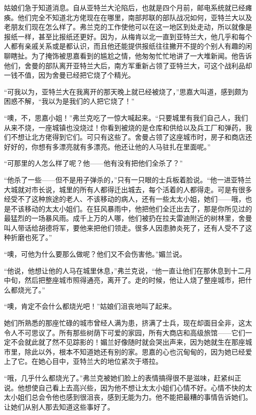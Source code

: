 \par 姑娘们急于知道消息。自从亚特兰大沦陷后，也就是四个月前，邮电系统就已经瘫痪。他们完全不知道北方佬现在在哪里，南部邦联的部队战况如何，亚特兰大以及老朋友们现在怎么样了。弗兰克的工作使他可以在这一地区到处走动，所以就像是报纸一样，甚至比报纸还更好。因为，从梅肯以北一直到亚特兰大，他几乎和每个人都有亲戚关系或是都认识，而且他还能提供报纸往往撇开不提的个别人有趣的闲聊瞎扯。为了掩饰被思嘉看到的尴尬之情，他匆匆忙忙地讲了一大堆新闻。他告诉他们，舍曼的部队离开亚特兰大后，南方军重新占领了亚特兰大，可这个战利品却一钱不值，因为舍曼已经把它烧了个精光。
\par “可我以为，亚特兰大在我离开的那天晚上就已经被烧了，”思嘉大叫道，感到颇为困惑不解，“我以为是我们的人把它烧了！”
\par “噢，不，思嘉小姐！”弗兰克吃了一惊大喊起来。“只要城里有我们自己人，我们从来不烧，一座城镇也没烧过！你看到被烧的是仓库和供给以及兵工厂和弹药，我们不想让北方佬得到它们。可只有这些了。舍曼占领了这座城市时，房子和商店还好好的，你想有多漂亮就有多漂亮。他还让他的人马驻扎在里面呢。”
\par “可那里的人怎么样了呢？他——他有没有把他们全杀了？”
\par “他杀了一些——但不是用子弹杀的，”只有一只眼的士兵板着脸说。“他一进亚特兰大城就对市长说，城里的所有人都得迁出城去，每个活着的人都得走。可是有很多经受不了这种旅途的老人、不该移动的病人，还有一些太太小姐，她们——哦，也是不该移动的太太小姐们。在狂风暴雨中，他把他们全迁出去了，那是你所见过的最猛烈的一场暴风雨。成千上万的人哪，他们被扔在拉夫雷迪附近的树林里，舍曼叫人带话给胡德将军，要他来把他们领走。很多人因患肺炎死了，还有人受不了这种折磨也死了。”
\par “噢，可他为什么要那么做呢？他们又不会伤害他。”媚兰说。
\par “他说，他想让他的人马在城里休息，”弗兰克说，“他一直让他们在那休息到十二月中旬，然后把整座城市照得通亮，离开了。走的时候，他让人烧了整座城市，把什么都烧光了。”
\par “噢，肯定不会什么都烧光吧！”姑娘们沮丧地叫了起来。
\par 她们所熟悉的那座忙碌的城市曾经人满为患，挤满了士兵，现在却面目全非，这太令人不可思议了。所有那些树荫下可爱的家园，所有大商店和高级旅馆——它们一定不会就此就了然不见踪影的！媚兰好像随时就会哭出声来，因为她就生在那座城市里，除此以外，根本不知道她还有别的家。思嘉的心也沉甸甸的，因为她已经爱上了它。在她心目中，亚特兰大的地位紧次于塔拉。
\par “哦，几乎什么都烧光了。”弗兰克被她们脸上的表情搞得很不是滋味，赶紧纠正说。他想使自己看上去高兴些，因为他不想让太太小姐们心情不好。心情不快的太太小姐们总会令他也感到很沮丧，感到无能为力。他不能把最糟的事情告诉她们。让她们从别人那去知道这些事好了。
